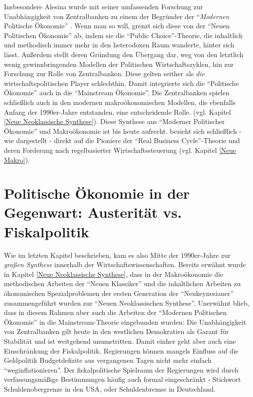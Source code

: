 Insbesondere Alesina wurde mit seiner umfassenden Forschung zur Unabhängigkeit von Zentralbanken zu einem der Begründer der "`\textit{Modernen} Politische Ökonomie"' \parencite{Mineo2020}. Wenn man so will, grenzt sich diese von der "`Neuen Politischen Ökonomie"' ab, indem sie die "`Public Choice"'-Theorie, die inhaltlich und methodisch immer mehr in den heterodoxen Raum wanderte, hinter sich lässt. Außerdem stellt deren Gründung den Übergang dar, weg von den letztlich wenig gewinnbringenden Modellen der Politischen Wirtschaftszyklen, hin zur Forschung zur Rolle von Zentralbanken. Diese gelten seither als \textit{die} wirtschaftspolitischen Player schlechthin. Damit integrierte sich die "`Politische Ökonomie"' auch in die "`Mainstream Ökonomie"'. Die Zentralbanken spielen schließlich auch in den modernen makroökonomischen Modellen, die ebenfalls Anfang der 1990er-Jahre entstanden, eine entscheidende Rolle. (vgl. Kapitel \ref{Neue Neoklassische Synthese}). Diese Synthese aus "`Moderner Politischer Ökonomie"' und Makroökonomie ist bis heute aufrecht. \textcite[S. 653]{Alesina1987} bezieht sich schließlich - wie dargestellt - direkt auf die Pioniere der "`Real Business Cycle"'-Theorie \textcite{Kydland1977} und deren Forderung nach regelbasierter Wirtschaftssteuerung (vgl. Kapitel \ref{Neue Makro}). 

\section{Politische Ökonomie in der Gegenwart: Austerität vs. Fiskalpolitik}
\label{PolEcon_Gegenwart}

Wie im letzten Kapitel beschrieben, kam es also Mitte der 1990er-Jahre zur \textit{großen Synthese} innerhalb der Wirtschaftswissenschaften. Bereits erwähnt wurde in Kapitel \ref{Neue Neoklassische Synthese}, dass in der Makroökonomie die methodischen Arbeiten der "`Neuen Klassiker"' und die inhaltlichen Arbeiten zu ökonomischen Spezialproblemen der ersten Generation der "`Neukeynesianer"' zusammengeführt wurden zur "`Neuen Neoklassischen Synthese"'. Unerwähnt blieb, dass in diesem Rahmen aber auch die Arbeiten der "`Modernen Politischen Ökonomie"' in die Mainstream-Theorie eingebunden wurden: Die Unabhängigkeit von Zentralbanken gilt heute in den westlichen Demokratien als Garant für Stabilität und ist weitgehend unumstritten. Damit einher geht aber auch eine Einschränkung der Fiskalpolitik. Regierungen können mangels Einfluss auf die Geldpolitik Budgetdefizite aus vergangenen Tagen nicht mehr einfach "`weginflationieren"'. Der fiskalpolitische Spielraum der Regierungen wird durch verfassungsmäßige Bestimmungen häufig auch formal eingeschränkt - Stichwort Schuldenobergrenze in den USA, oder Schuldenbremse in Deutschland.

